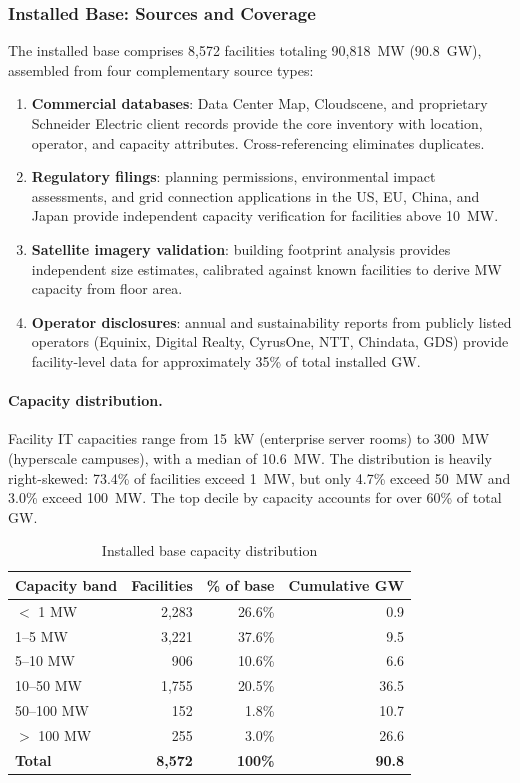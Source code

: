 \subsubsection{Installed Base: Sources and Coverage}

The installed base comprises 8{,}572 facilities totaling 90{,}818~MW (90.8~GW),
assembled from four complementary source types:

\begin{enumerate}
\item \textbf{Commercial databases}: Data Center Map, Cloudscene, and proprietary
Schneider Electric client records provide the core inventory with location, operator,
and capacity attributes. Cross-referencing eliminates duplicates.
\item \textbf{Regulatory filings}: planning permissions, environmental impact assessments,
and grid connection applications in the US, EU, China, and Japan provide independent
capacity verification for facilities above 10~MW.
\item \textbf{Satellite imagery validation}: building footprint analysis provides
independent size estimates, calibrated against known facilities to derive MW capacity
from floor area.
\item \textbf{Operator disclosures}: annual and sustainability reports from publicly
listed operators (Equinix, Digital Realty, CyrusOne, NTT, Chindata, GDS) provide
facility-level data for approximately 35\% of total installed GW.
\end{enumerate}

\paragraph{Capacity distribution.} Facility IT capacities range from 15~kW (enterprise
server rooms) to 300~MW (hyperscale campuses), with a median of 10.6~MW. The distribution
is heavily right-skewed: 73.4\% of facilities exceed 1~MW, but only 4.7\% exceed 50~MW
and 3.0\% exceed 100~MW. The top decile by capacity accounts for over 60\% of total GW.

\begin{table}[H]
\centering
\small
\caption{Installed base capacity distribution}
\label{tab:app_mw_dist}
\begin{tabular}{@{}lrrr@{}}
\toprule
\textbf{Capacity band} & \textbf{Facilities} & \textbf{\% of base} & \textbf{Cumulative GW} \\
\midrule
$<$ 1 MW & 2{,}283 & 26.6\% & 0.9 \\
1--5 MW & 3{,}221 & 37.6\% & 9.5 \\
5--10 MW & 906 & 10.6\% & 6.6 \\
10--50 MW & 1{,}755 & 20.5\% & 36.5 \\
50--100 MW & 152 & 1.8\% & 10.7 \\
$>$ 100 MW & 255 & 3.0\% & 26.6 \\
\midrule
\textbf{Total} & \textbf{8{,}572} & \textbf{100\%} & \textbf{90.8} \\
\bottomrule
\end{tabular}
\end{table}


